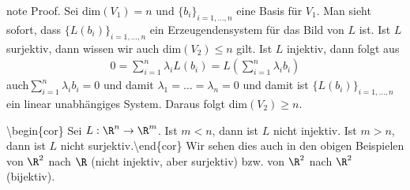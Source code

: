 \documentclass[letterpaper,10pt,english]{jupyterBook}
\begin{document}
\begin{sphinxadmonition}{note}
Proof.  Sei dim\((V_1)=n\) und \(\{b_i\}_{i=1,\ldots,n}\) eine Basis für \(V_1\). Man sieht sofort, dass \(\{L(b_i)\}_{i=1,\ldots,n}\) ein Erzeugendensystem für das Bild von \(L\) ist. Ist \(L\) surjektiv, dann wissen wir auch dim\((V_2) \leq n\) gilt. Ist \(L\) injektiv, dann folgt aus
\begin{equation*}
\begin{split} 0 = \sum_{i=1}^n \lambda_i L(b_i) = L( \sum_{i=1}^n \lambda_i b_i)\end{split}
\end{equation*}
auch\(\sum_{i=1}^n \lambda_i b_i = 0\) und damit \(\lambda_1=\ldots=\lambda_n = 0\) und damit ist \(\{L(b_i)\}_{i=1,\ldots,n}\) ein linear unabhängiges System. Daraus folgt dim\((V_2) \geq n\).
\end{sphinxadmonition}

\textbackslash{}begin\{cor\}
Sei \(L: \R^n \rightarrow \R^m\). Ist \(m < n\), dann ist \(L\) nicht injektiv. Ist \(m> n\), dann ist \(L\) nicht surjektiv.\textbackslash{}end\{cor\}
Wir sehen dies auch in den obigen Beispielen von \(\R^2\) nach  \(\R\) (nicht injektiv, aber surjektiv) bzw. von \(\R^2\) nach \(\R^2\) (bijektiv).
\end{document}
